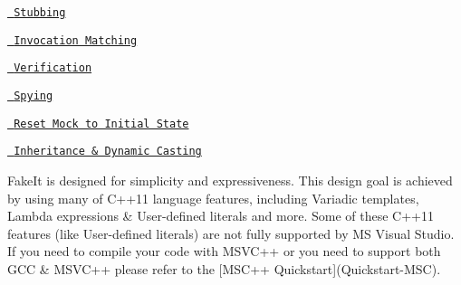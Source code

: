 
\begin{DoxyItemize}
\item \href{\#stubbing}{\texttt{ Stubbing}}
\item \href{\#invocation-matching}{\texttt{ Invocation Matching}}
\item \href{\#verification}{\texttt{ Verification}}
\item \href{\#spying}{\texttt{ Spying}}
\item \href{\#reset-mock-to-initial-state}{\texttt{ Reset Mock to Initial State}}
\item \href{\#inheritance--dynamic-casting}{\texttt{ Inheritance \& Dynamic Casting}}
\end{DoxyItemize}

Fake\+It is designed for simplicity and expressiveness. This design goal is achieved by using many of C++11 language features, including Variadic templates, Lambda expressions \& User-\/defined literals and more. Some of these C++11 features (like User-\/defined literals) are not fully supported by MS Visual Studio. If you need to compile your code with M\+S\+V\+C++ or you need to support both G\+CC \& M\+S\+V\+C++ please refer to the \mbox{[}M\+S\+C++ Quickstart\mbox{]}(Quickstart-\/\+M\+SC).

